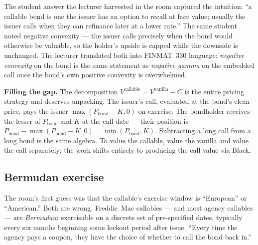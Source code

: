 The student answer the lecturer harvested in the room captured the
intuition: ``a callable bond is one the issuer has an option to recall
at face value; usually the issuer calls when they can refinance later
at a lower rate.'' The same student noted negative convexity --- the
issuer calls precisely when the bond would otherwise be valuable, so
the holder's upside is capped while the downside is unchanged. The
lecturer translated both into FINMAT~330 language: \emph{negative
convexity} on the bond is the same statement as \emph{negative gamma}
on the embedded call once the bond's own positive convexity is
overwhelmed.

\begin{tipblock}
\textbf{Filling the gap.} The decomposition $V^{\text{callable}} =
V^{\text{vanilla}} - C$ is the entire pricing strategy and deserves
unpacking. The issuer's call, evaluated at the bond's clean price,
pays the issuer $\max(P_{\text{bond}} - K, 0)$ on exercise. The
bondholder receives the lesser of $P_{\text{bond}}$ and $K$ at the
call date --- their position is $P_{\text{bond}} - \max(P_{\text{bond}}
- K, 0) = \min(P_{\text{bond}}, K)$. Subtracting a long call from a
long bond is the same algebra. To value the callable, value the
vanilla and value the call separately; the work shifts entirely to
producing the call value via Black.
\end{tipblock}

\subsection{Bermudan exercise}\label{L5-sec:callable-bermudan}

The room's first guess was that the callable's exercise window is
``European'' or ``American.'' Both are wrong. Freddie~Mac callables ---
and most agency callables --- are \emph{Bermudan}: exercisable on a
discrete set of pre-specified dates, typically every six months
beginning some lockout period after issue. ``Every time the agency
pays a coupon, they have the choice of whether to call the bond back
in.''

